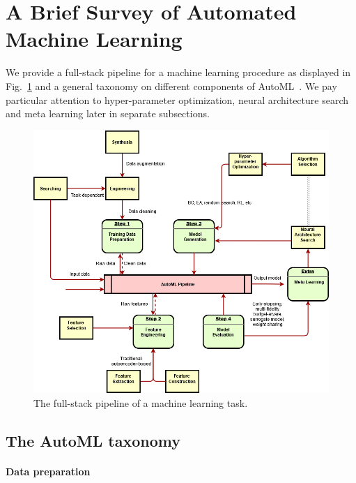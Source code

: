 \section{A Brief Survey of Automated Machine Learning}\label{sec:dttts.survey}

We provide a full-stack pipeline for a machine learning procedure as displayed in Fig.~\ref{fig:automl} and a general taxonomy on different components of AutoML~\citep{hutter2019automl,zoller2019automl,he2019automl}. We pay particular attention to hyper-parameter optimization, neural architecture search and meta learning later in separate subsections.

\begin{figure}[ht]
    \centering
    \includegraphics[width=\textwidth]{Chapter6/img/automl.png}
    \caption{The full-stack pipeline of a machine learning task.}
    \label{fig:automl}
\end{figure}


\subsection{The AutoML taxonomy}\label{sec:dttts.survey.taxonomy}

\paragraph{Data preparation}

